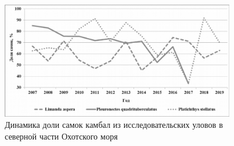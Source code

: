 \begin{figure}[h!]
  \begin{center}
    \includegraphics[width=0.9\textwidth]{authors/Byrlak-fig4.png}
  \end{center}
  \caption{Динамика доли самок камбал из исследовательских уловов в северной части Охотского моря}
  \label{fig:byrlak-fig4}
\end{figure}
